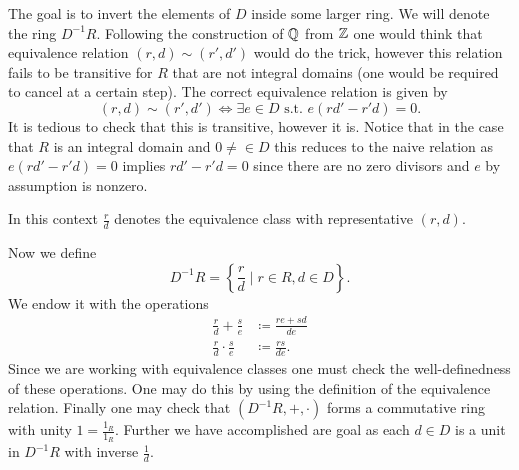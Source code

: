 \documentclass[master.tex]{subfiles}
\begin{document}
  The goal is to invert the elements of \(D\) inside some larger ring. We will denote the ring \(D^{-1}R\). Following
  the construction of \({\mathbb Q}\) from \({\mathbb Z}\) one would think that equivalence relation \((r,d)\sim (r',d')\) would do the
  trick, however this relation fails to be transitive for \(R\) that are not integral domains (one would be required to
  cancel at a certain step). The correct equivalence relation is given by
  \[(r,d) \sim (r',d') \iff \exists e \in D \text{ s.t. } e(rd'-r'd)=0. \]
  It is tedious to check that this is transitive, however it is. Notice that in the case that \(R\) is an integral
  domain and \(0 \neq \in D\) this reduces to the naive relation as \(e(rd'-r'd)=0\) implies \(rd'-r'd=0\) since there
  are no zero divisors and \(e\) by assumption is nonzero. 

  \begin{notation}
    In this context \(\frac{r}{d}\) denotes the equivalence class with representative \((r,d)\).
  \end{notation}

  Now we define
  \[D^{-1}R= \left\{\frac{r}{d} \mid r \in R, d \in D\right\}.\] 
  We endow it with the operations 
  \begin{align*}
    \frac{r}{d}+\frac{s}{e} &\coloneqq \frac{re+sd}{de}\\
    \frac{r}{d}\cdot\frac{s}{e} &\coloneqq \frac{rs}{de}.
  \end{align*}
  Since we are working with equivalence classes one must check the well-definedness of these operations. One may do this
  by using the definition of the equivalence relation. Finally one may check that \((D^{-1}R,+,\cdot)\) forms a
  commutative ring with unity \(1=\frac{1_R}{1_R}\). Further we have accomplished are goal as each \(d \in D\) is a unit
  in \(D^{-1}R\) with inverse \(\frac{1}{d}\).
\end{document}
